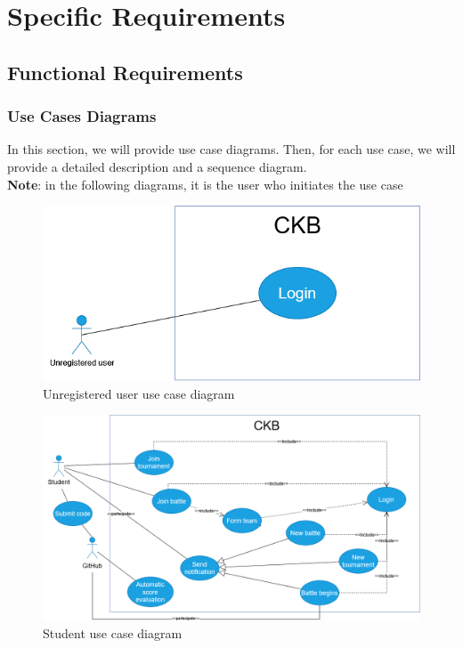 \section{Specific Requirements}
\subsection{Functional Requirements}


\subsubsection{Use Cases Diagrams}
In this section, we will provide use case diagrams. Then, for each use case, we will provide a detailed description and a sequence diagram.
\\
\textbf{Note}: in the following diagrams, it is the user who initiates the use case

\vspace{3px}
\begin{figure}[H]
    \centering
    \includegraphics[scale=0.6]{src/uc_diagrams/unregistered_user.png}
    \caption{Unregistered user use case diagram}
\end{figure}

\vspace{3px}
\begin{figure}[H]
    \centering
    \includegraphics[width=\textwidth]{src/uc_diagrams/student.png}
    \caption{Student use case diagram}
\end{figure}


